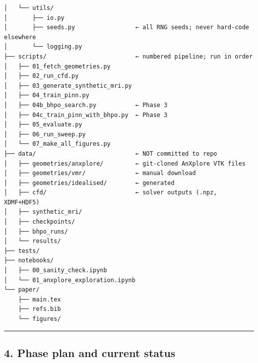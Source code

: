 \documentclass[
]{article}
\begin{document}
\begin{verbatim}
│   └── utils/
│       ├── io.py
│       ├── seeds.py                 ← all RNG seeds; never hard-code elsewhere
│       └── logging.py
├── scripts/                         ← numbered pipeline; run in order
│   ├── 01_fetch_geometries.py
│   ├── 02_run_cfd.py
│   ├── 03_generate_synthetic_mri.py
│   ├── 04_train_pinn.py
│   ├── 04b_bhpo_search.py           ← Phase 3
│   ├── 04c_train_pinn_with_bhpo.py  ← Phase 3
│   ├── 05_evaluate.py
│   ├── 06_run_sweep.py
│   └── 07_make_all_figures.py
├── data/                            ← NOT committed to repo
│   ├── geometries/anxplore/         ← git-cloned AnXplore VTK files
│   ├── geometries/vmr/              ← manual download
│   ├── geometries/idealised/        ← generated
│   ├── cfd/                         ← solver outputs (.npz, XDMF+HDF5)
│   ├── synthetic_mri/
│   ├── checkpoints/
│   ├── bhpo_runs/
│   └── results/
├── tests/
├── notebooks/
│   ├── 00_sanity_check.ipynb
│   └── 01_anxplore_exploration.ipynb
└── paper/
    ├── main.tex
    ├── refs.bib
    └── figures/
\end{verbatim}

\begin{center}\rule{0.5\linewidth}{0.5pt}\end{center}

\subsection{4. Phase plan and current
status}\label{phase-plan-and-current-status}
\end{document}
